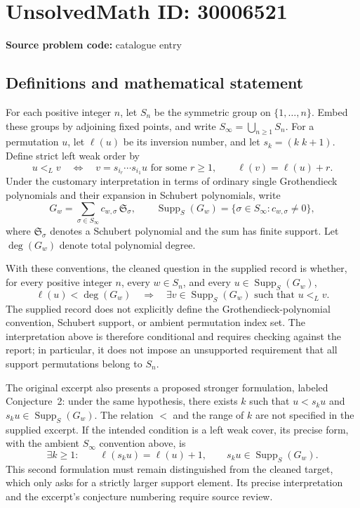 \documentclass[11pt]{article}
\begin{document}
\section*{UnsolvedMath ID: 30006521}
\textbf{Source problem code:} catalogue entry
\subsection{Definitions and mathematical statement}
For each positive integer \(n\), let \(S_n\) be the symmetric group on \(\{1,\ldots,n\}\). Embed these groups by adjoining fixed points, and write \(S_\infty=\bigcup_{n\geq1}S_n\). For a permutation \(u\), let \(\ell(u)\) be its inversion number, and let \(s_k=(k\;k+1)\). Define strict left weak order by
\[
u<_L v
\quad\Longleftrightarrow\quad
v=s_{i_r}\cdots s_{i_1}u\text{ for some }r\geq1,
\qquad \ell(v)=\ell(u)+r.
\]
Under the customary interpretation in terms of ordinary single Grothendieck polynomials and their expansion in Schubert polynomials, write
\[
G_w=\sum_{\sigma\in S_\infty}c_{w,\sigma}\,\mathfrak S_\sigma,
\qquad
\operatorname{Supp}_S(G_w)=\{\sigma\in S_\infty:c_{w,\sigma}\neq0\},
\]
where \(\mathfrak S_\sigma\) denotes a Schubert polynomial and the sum has finite support. Let \(\deg(G_w)\) denote total polynomial degree.

With these conventions, the cleaned question in the supplied record is whether, for every positive integer \(n\), every \(w\in S_n\), and every \(u\in\operatorname{Supp}_S(G_w)\),
\[
\ell(u)<\deg(G_w)
\quad\Longrightarrow\quad
\exists v\in\operatorname{Supp}_S(G_w)\text{ such that }u<_L v.
\]
The supplied record does not explicitly define the Grothendieck-polynomial convention, Schubert support, or ambient permutation index set. The interpretation above is therefore conditional and requires checking against the report; in particular, it does not impose an unsupported requirement that all support permutations belong to \(S_n\).

The original excerpt also presents a proposed stronger formulation, labeled Conjecture~2: under the same hypothesis, there exists \(k\) such that \(u<s_ku\) and \(s_ku\in\operatorname{Supp}_S(G_w)\). The relation \(<\) and the range of \(k\) are not specified in the supplied excerpt. If the intended condition is a left weak cover, its precise form, with the ambient \(S_\infty\) convention above, is
\[
\exists k\geq1:\qquad
\ell(s_ku)=\ell(u)+1,
\qquad s_ku\in\operatorname{Supp}_S(G_w).
\]
This second formulation must remain distinguished from the cleaned target, which only asks for a strictly larger support element. Its precise interpretation and the excerpt's conjecture numbering require source review.
\end{document}
